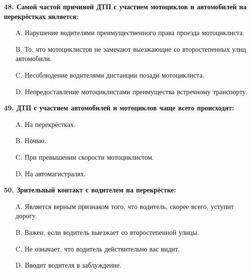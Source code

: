 \begin{minipage}{\linewidth}
\vspace{1em}\noindent\textbf{48. Самой частой причиной ДТП с участием мотоциклов и автомобилей на перекрёстках является:}

\begin{itemize}[nosep,leftmargin=2em]
\item [A.] Нарушение водителями преимущественного права проезда мотоциклиста.
\item [B.] То, что мотоциклистов не замечают выезжающие со второстепенных улиц автомобили.
\item [C.] Несоблюдение водителями дистанции позади мотоциклиста.
\item [D.] Непредоставление мотоциклистами преимущества встречному транспорту.

\end{itemize}
\end{minipage}


\begin{minipage}{\linewidth}
\vspace{1em}\noindent\textbf{49. ДТП с участием автомобилей и мотоциклов чаще всего происходят:}

\begin{itemize}[nosep,leftmargin=2em]
\item [A.] На перекрёстках.
\item [B.] Ночью.
\item [C.] При превышении скорости мотоциклистом.
\item [D.] На автомагистралях.

\end{itemize}
\end{minipage}


\begin{minipage}{\linewidth}
\vspace{1em}\noindent\textbf{50. Зрительный контакт с водителем на перекрёстке:}

\begin{itemize}[nosep,leftmargin=2em]
\item [A.] Является верным признаком того, что водитель, скорее всего, уступит дорогу.
\item [B.] Важен, если водитель выезжает со второстепенной улицы.
\item [C.] Не означает, что водитель действительно вас видит.
\item [D.] Вводит водителя в заблуждение.

\end{itemize}
\end{minipage}



